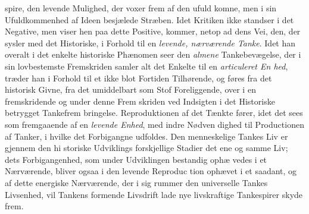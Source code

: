 spire, den levende Mulighed, der voxer frem af den ufuld\-%
komne, men i sin Ufuldkommenhed af Ideen besjælede Stræben.
Idet Kritiken ikke standser i det Negative, men viser hen
paa dette Positive, kommer, netop ad dens Vei, den, der sysler
med det Historiske, i Forhold til en \emph{levende, nærværende
Tanke}. Idet han overalt i det enkelte historiske Phænomen
seer den \emph{almene} Tankebevægelse, der i sin lovbestemste
Fremskriden samler alt det Enkelte til en \emph{articuleret En\-%
hed}, træder han i Forhold til et ikke blot Fortiden Tilhørende, og
føres fra det historisk Givne, fra det umiddelbart som Stof
Foreliggende, over i en fremskridende og under denne Frem\-%
skriden ved Indsigten i det Historiske betrygget Tankefrem\-%
bringelse. Reproduktionen af det Tænkte fører, idet det sees
som fremgaaende af en \emph{levende Enhed}, med indre Nødven\-%
dighed til Productionen af Tanker, i hvilke det Forbigangne
udfoldes. Den menneskelige Tankes Liv er gjennem den hi\-%
storiske Udviklings forskjellige Stadier det ene og samme Liv;
dets Forbigangenhed, som under Udviklingen bestandig ophæ\-%
vedes i et Nærværende, bliver ogsaa i den levende Reproduc\-%
tion ophævet i et saadant, og af dette energiske Nærværende,
der i sig rummer den universelle Tankes Livsenhed, vil
Tankens formende Livsdrift lade nye livskraftige Tankespirer
skyde frem.

\divrule

